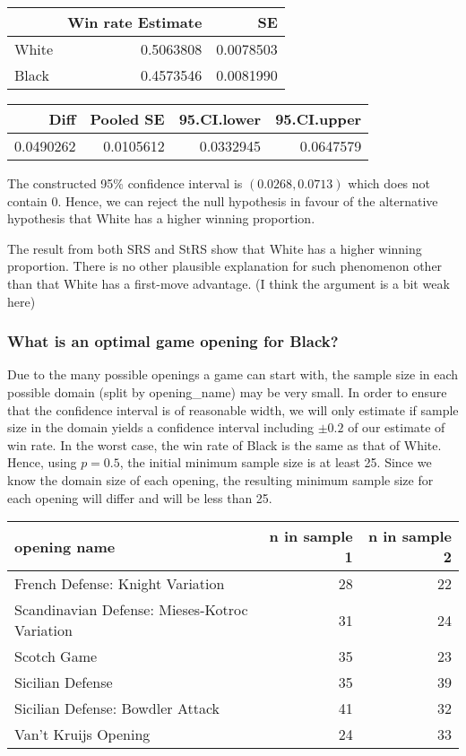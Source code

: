 \documentclass[11pt,]{article}
\begin{document}
\begin{tabular}{l|r|r}
\hline
  & Win rate Estimate & SE\\
\hline
White & 0.5063808 & 0.0078503\\
\hline
Black & 0.4573546 & 0.0081990\\
\hline
\end{tabular}

\begin{tabular}{r|r|r|r}
\hline
Diff & Pooled SE & 95.CI.lower & 95.CI.upper\\
\hline
0.0490262 & 0.0105612 & 0.0332945 & 0.0647579\\
\hline
\end{tabular}

The constructed 95\% confidence interval is \((0.0268, 0.0713)\) which
does not contain 0. Hence, we can reject the null hypothesis in favour
of the alternative hypothesis that White has a higher winning
proportion.\\
\newline

The result from both SRS and StRS show that White has a higher winning
proportion. There is no other plausible explanation for such phenomenon
other than that White has a first-move advantage. (I think the argument
is a bit weak here) \newpage

\hypertarget{what-is-an-optimal-game-opening-for-black}{%
\subsubsection{What is an optimal game opening for
Black?}\label{what-is-an-optimal-game-opening-for-black}}

Due to the many possible openings a game can start with, the sample size
in each possible domain (split by opening\_name) may be very small. In
order to ensure that the confidence interval is of reasonable width, we
will only estimate if sample size in the domain yields a confidence
interval including \(\pm 0.2\) of our estimate of win rate. In the worst
case, the win rate of Black is the same as that of White. Hence, using
\(p=0.5\), the initial minimum sample size is at least 25. Since we know
the domain size of each opening, the resulting minimum sample size for
each opening will differ and will be less than 25. \newline

\begin{tabular}{l|r|r}
\hline
opening name & n in sample 1 & n in sample 2\\
\hline
French Defense: Knight Variation & 28 & 22\\
\hline
Scandinavian Defense: Mieses-Kotroc Variation & 31 & 24\\
\hline
Scotch Game & 35 & 23\\
\hline
Sicilian Defense & 35 & 39\\
\hline
Sicilian Defense: Bowdler Attack & 41 & 32\\
\hline
Van't Kruijs Opening & 24 & 33\\
\hline
\end{tabular}
\end{document}
